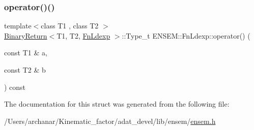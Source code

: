 \mbox{\label{structENSEM_1_1FnLdexp_a018e96259f66cd8923edf0610629b52c}} 
\subsubsection{\texorpdfstring{operator()()}{operator()()}\hspace{0.1cm}{\footnotesize\ttfamily [2/2]}}
{\footnotesize\ttfamily template$<$class T1 , class T2 $>$ \\
\mbox{\hyperlink{structENSEM_1_1BinaryReturn}{Binary\+Return}}$<$T1, T2, \mbox{\hyperlink{structENSEM_1_1FnLdexp}{Fn\+Ldexp}} $>$\+::Type\+\_\+t E\+N\+S\+E\+M\+::\+Fn\+Ldexp\+::operator() (\begin{DoxyParamCaption}\item[{const T1 \&}]{a,  }\item[{const T2 \&}]{b }\end{DoxyParamCaption}) const\hspace{0.3cm}{\ttfamily [inline]}}



The documentation for this struct was generated from the following file\+:\begin{DoxyCompactItemize}
\item 
/\+Users/archanar/\+Kinematic\+\_\+factor/adat\+\_\+devel/lib/ensem/\mbox{\hyperlink{lib_2ensem_2ensem_8h}{ensem.\+h}}\end{DoxyCompactItemize}
